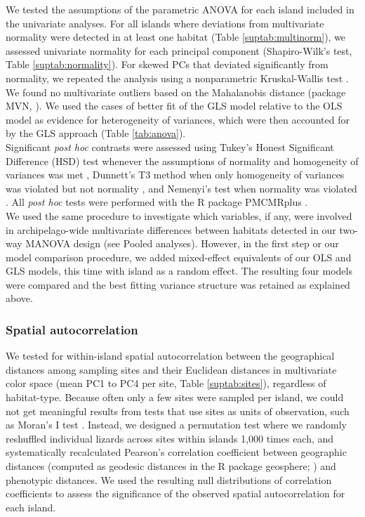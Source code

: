 We tested the assumptions of the parametric ANOVA for each island included in the univariate analyses. For all islands where deviations from multivariate normality were detected in at least one habitat (Table \ref{suptab:multinorm}), we assessed univariate normality for each principal component (Shapiro-Wilk's test, Table \ref{suptab:normality}). For skewed PCs that deviated significantly from normality, we repeated the analysis using a nonparametric Kruskal-Wallis test \citep{Hollander2013}. We found no multivariate outliers based on the Mahalanobis distance (package MVN, \citealt{Korkmaz2014}). We used the cases of better fit of the GLS model relative to the OLS model as evidence for heterogeneity of variances, which were then accounted for by the GLS approach (Table \ref{tab:anova}).\\

Significant \textit{post hoc} contrasts were assessed using Tukey's Honest Significant Difference (HSD) test whenever the assumptions of normality and homogeneity of variances was met \citep{Tukey1949}, Dunnett's T3 method when only homogeneity of variances was violated but not normality \citep{Dunnett1980}, and Nemenyi's test when normality was violated \citep{Nemenyi1963}. All \textit{post hoc} tests were performed with the R package PMCMRplus \citep{Pohlert2020}.\\

We used the same procedure to investigate which variables, if any, were involved in archipelago-wide multivariate differences between habitats detected in our two-way MANOVA design (see Pooled analyses). However, in the first step or our model comparison procedure, we added mixed-effect equivalents of our OLS and GLS models, this time with island as a random effect. The resulting four models were compared and the best fitting variance structure was retained as explained above.

\subsubsection*{Spatial autocorrelation}

We tested for within-island spatial autocorrelation between the geographical distances among sampling sites and their Euclidean distances in multivariate color space (mean PC1 to PC4 per site, Table \ref{suptab:sites}), regardless of habitat-type. Because often only a few sites were sampled per island, we could not get meaningful results from tests that use sites as units of observation, such as Moran's I test \citep{Gittleman1990}. Instead, we designed a permutation test where we randomly reshuffled individual lizards across sites within islands 1,000 times each, and systematically recalculated Pearson's correlation coefficient between geographic distances (computed as geodesic distances in the R package geosphere; \citealt{Hijmans2019}) and phenotypic distances. We used the resulting null distributions of correlation coefficients to assess the significance of the observed spatial autocorrelation for each island.

